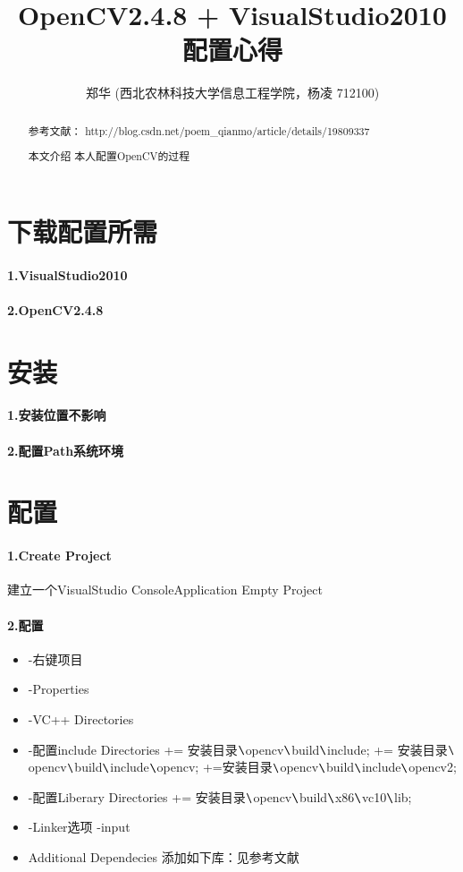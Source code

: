 \documentclass[UTF8,a4paper,8pt]{ctexart}
\author{郑华
	\small	(西北农林科技大学信息工程学院，杨凌 712100)}
\title{OpenCV2.4.8 + VisualStudio2010 配置心得}
\begin{document}
 
 	\maketitle
 	
 	\begin{abstract}
 		参考文献：
 	http://blog.csdn.net/poem\_qianmo/article/details/19809337
 		
    本文介绍 本人配置OpenCV的过程
	\end{abstract}
	
	
\section{下载配置所需}
	\paragraph{1.VisualStudio2010}
	\paragraph{2.OpenCV2.4.8}
	
\section{安装}
    \paragraph{1.安装位置不影响}
    \paragraph{2.配置Path系统环境}	
    
\section{配置}
    \paragraph{1.Create Project}建立一个VisualStudio  ConsoleApplication Empty Project
    \paragraph{2.配置}
     	\begin{itemize}
     		\item -右键项目
     		\item -Properties
     		\item -VC++ Directories
     		\item -配置include Directories += 安装目录$ \verb|\|$opencv$ \verb|\|$build$ \verb|\|$include; += 安装目录$ \verb|\|$ opencv$ \verb|\|$build$ \verb|\|$include$ \verb|\|$opencv; +=安装目录$ \verb|\|$opencv$ \verb|\|$build$ \verb|\|$include$ \verb|\|$opencv2;
     		\item -配置Liberary Directories += 安装目录$ \verb|\|$opencv$ \verb|\|$build$ \verb|\|$x86$ \verb|\|$vc10$ \verb|\|$lib;
     		\item -Linker选项 -input
     		\item Additional Dependecies 添加如下库：见参考文献
     	\end{itemize}
    
\end{document}
